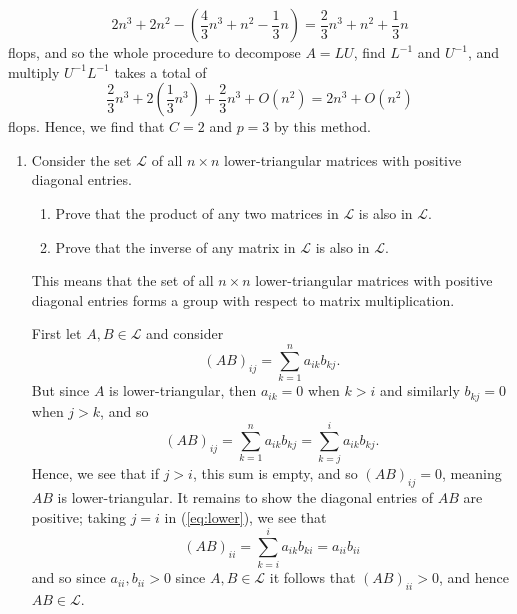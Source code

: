 \documentclass{../../../kin_math}
\begin{document}
\begin{questions}
\begin{enumerate}
\begin{solution}
\begin{equation*}
        2n^3 + 2n^2 - \left(\frac{4}{3}n^3 + n^2 - \frac{1}{3}n\right) = \frac{2}{3}n^3 + n^2 + \frac{1}{3}n
      \end{equation*}
      flops, and so the whole procedure to decompose $A = LU$, find $L^{-1}$ and $U^{-1}$, and multiply $U^{-1}L^{-1}$ takes a total of
      \begin{equation*}
        \frac{2}{3}n^3 + 2\left(\frac{1}{3}n^3\right) + \frac{2}{3}n^3 + O(n^2) = 2n^3 + O(n^2)
      \end{equation*}
      flops. Hence, we find that $C = 2$ and $p = 3$ by this method.
    \end{solution}
  \end{enumerate}

  \question
  \begin{enumerate}
    \item Consider the set $\mathcal{L}$ of all $n \times n$ lower-triangular matrices with positive diagonal entries.
    \begin{enumerate}[label=\roman*.]
      \item Prove that the product of any two matrices in $\mathcal{L}$ is also in $\mathcal{L}$.
      \item Prove that the inverse of any matrix in $\mathcal{L}$ is also in $\mathcal{L}$.
    \end{enumerate}
    This means that the set of all $n \times n$ lower-triangular matrices with positive diagonal entries forms a group with respect to matrix multiplication.
    \begin{solution}
      First let $A, B \in \mathcal{L}$ and consider
      \begin{equation*}
        (AB)_{ij} = \sum_{k = 1}^n a_{ik}b_{kj}.
      \end{equation*}
      But since $A$ is lower-triangular, then $a_{ik} = 0$ when $k > i$ and similarly $b_{kj} = 0$ when $j > k$, and so
      \begin{equation}
        \label{eq:lower}
        (AB)_{ij} = \sum_{k = 1}^n a_{ik}b_{kj} = \sum_{k = j}^i a_{ik}b_{kj}.
      \end{equation}
      Hence, we see that if $j > i$, this sum is empty, and so $(AB)_{ij} = 0$, meaning $AB$ is lower-triangular. It remains to show the diagonal entries of $AB$ are positive; taking $j = i$ in (\ref{eq:lower}), we see that
      \begin{equation*}
        (AB)_{ii} = \sum_{k = i}^i a_{ik}b_{ki} = a_{ii}b_{ii}
      \end{equation*}
      and so since $a_{ii}, b_{ii} > 0$ since $A, B \in \mathcal{L}$ it follows that $(AB)_{ii} > 0$, and hence $AB \in \mathcal{L}$.


\end{solution}
\end{enumerate}
\end{questions}
\end{document}
